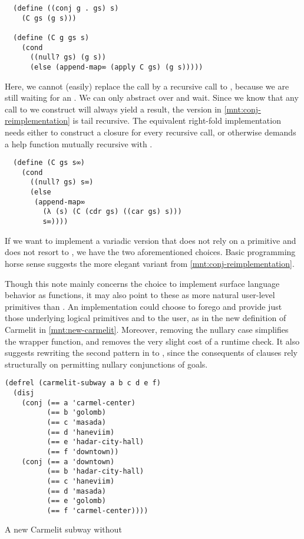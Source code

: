 \documentclass[sigplan,draft,balance,pbalance,natbib=false]{acmart}
\begin{document}
\begin{verbatim}
  (define ((conj g . gs) s)
    (C gs (g s)))

  (define (C g gs s)
    (cond
      ((null? gs) (g s))
      (else (append-map∞ (apply C gs) (g s)))))
\end{verbatim}

\noindent Here, we cannot (easily) replace the  call
by a recursive call to , because we are still waiting
for an . We can only abstract over  and
wait. Since we know that any call to  we
construct will always yield a result, the version in
\cref{mnt:conj-reimplementation} is tail recursive. The equivalent
right-fold implementation needs either to construct a closure for
every recursive call, or otherwise demands a help function mutually
recursive with .

\begin{verbatim}
  (define (C gs s∞)
    (cond
      ((null? gs) s∞)
      (else
       (append-map∞
         (λ (s) (C (cdr gs) ((car gs) s)))
         s∞))))
\end{verbatim}

If we want to implement a variadic version that does not rely on a
primitive  and does not resort to
, we have the two aforementioned choices. Basic
programming horse sense suggests the more elegant variant from
\cref{mnt:conj-reimplementation}.

Though this note mainly concerns the choice to implement surface
language behavior as functions, it may also point to these as more
natural user-level primitives than . An
implementation could choose to forego  and provide
just those underlying logical primitives 
and  to the user, as in the new definition of
Carmelit in \cref{mnt:new-carmelit}. Moreover, removing the nullary
case simplifies the wrapper function, and removes the very slight cost
of a runtime  check. It also suggests rewriting the
second pattern in 
to , since the consequents
of  clauses rely structurally on permitting nullary
conjunctions of goals.

\begin{listing}
  \begin{verbatim}
(defrel (carmelit-subway a b c d e f)
  (disj
    (conj (== a 'carmel-center)
          (== b 'golomb)
          (== c 'masada)
          (== d 'haneviim)
          (== e 'hadar-city-hall)
          (== f 'downtown))
    (conj (== a 'downtown)
          (== b 'hadar-city-hall)
          (== c 'haneviim)
          (== d 'masada)
          (== e 'golomb)
          (== f 'carmel-center))))
  \end{verbatim}
  \caption{A new Carmelit subway without }
  \label{mnt:new-carmelit}
\end{listing}
\end{document}
